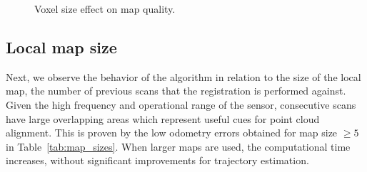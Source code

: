 \begin{figure}[h]
    \centering
    \hspace{1pt}
    \caption[Voxel size effect on map quality]{Voxel size effect on map quality.}
    \label{fig:voxel-size-mapping}
\end{figure}




\subsection{Local map size}

Next, we observe the behavior of the algorithm in relation to the size of the local map, \ie the number of previous scans that the registration is performed against. Given the high frequency and operational range of the sensor, consecutive scans have large overlapping areas which represent useful cues for point cloud alignment. This is proven by the low odometry errors obtained for map size $\geq 5$ in Table~\ref{tab:map_sizes}. When larger maps are used, the computational time increases, without significant improvements for trajectory estimation.


